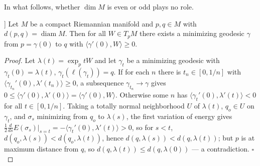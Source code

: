 In what follows, whether $\dim M$ is even or odd plays no role.

\begin{lemma}[Berger [Br 1]]
  \label{lem:dc-ch13-4-1}
  Let $M$ be a compact Riemannian manifold and $p,q\in M$ with
  $d(p,q)=\operatorname{diam}M$. Then for all $W\in T_pM$ there exists a minimizing
  geodesic $\gamma$ from $p=\gamma(0)$ to $q$ with $\langle\gamma'(0),W\rangle\geq0$.
\end{lemma}
\begin{proof}
  Let $\lambda(t)=\exp_p tW$ and let $\gamma_t$ be a minimizing geodesic with
  $\gamma_t(0)=\lambda(t)$, $\gamma_t(\ell(\gamma_t))=q$. If for each $n$ there is
  $t_n\in[0,1/n]$ with $\langle\gamma_{t_n}'(0),\lambda'(t_n)\rangle\geq0$, a
  subsequence $\gamma_{t_n}\to\gamma$ gives
  $0\leq\langle\gamma'(0),\lambda'(0)\rangle=\langle\gamma'(0),W\rangle$. Otherwise
  some $n$ has $\langle\gamma_t'(0),\lambda'(t)\rangle<0$ for all $t\in[0,1/n]$. Taking
  a totally normal neighborhood $U$ of $\lambda(t)$, $q_o\in U$ on $\gamma_t$, and
  $\sigma_s$ minimizing from $q_o$ to $\lambda(s)$, the first variation of energy gives
  $\tfrac{1}{2}\frac{d}{ds}E(\sigma_s)|_{s=t}=-\langle\gamma_t'(0),\lambda'(t)\rangle>0$,
  so for $s<t$, $d(q_o,\lambda(s))<d(q_o,\lambda(t))$, hence
  $d(q,\lambda(s))<d(q,\lambda(t))$; but $p$ is at maximum distance from $q$, so
  $d(q,\lambda(t))\leq d(q,\lambda(0))$ — a contradiction. $\square$
\end{proof}

